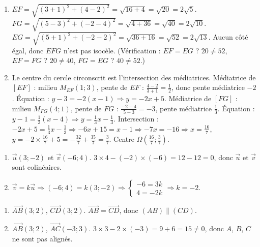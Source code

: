 \begin{enumerate}[label=\alph*)]
    \item $EF = \sqrt{(3+1)^2 + (4-2)^2} = \sqrt{16 + 4} = \sqrt{20} = 2\sqrt{5}$.
    $FG = \sqrt{(5-3)^2 + (-2-4)^2} = \sqrt{4 + 36} = \sqrt{40} = 2\sqrt{10}$.
    $EG = \sqrt{(5+1)^2 + (-2-2)^2} = \sqrt{36 + 16} = \sqrt{52} = 2\sqrt{13}$.
    Aucun côté égal, donc $EFG$ n'est pas isocèle. (Vérification : $EF = EG$ ? $20 \neq 52$, $EF = FG$ ? $20 \neq 40$, $FG = EG$ ? $40 \neq 52$.)
    \item Le centre du cercle circonscrit est l'intersection des médiatrices. Médiatrice de $[EF]$ : milieu $M_{EF}(1; 3)$, pente de $EF$ : $\frac{4-2}{3+1} = \frac{1}{2}$, donc pente médiatrice $-2$. Équation : $y - 3 = -2(x - 1) \Rightarrow y = -2x + 5$.
    Médiatrice de $[FG]$ : milieu $M_{FG}(4; 1)$, pente de $FG$ : $\frac{-2-4}{5-3} = -3$, pente médiatrice $\frac{1}{3}$. Équation : $y - 1 = \frac{1}{3}(x - 4) \Rightarrow y = \frac{1}{3}x - \frac{1}{3}$.
    Intersection : $-2x + 5 = \frac{1}{3}x - \frac{1}{3} \Rightarrow -6x + 15 = x - 1 \Rightarrow -7x = -16 \Rightarrow x = \frac{16}{7}$, $y = -2\times\frac{16}{7} + 5 = -\frac{32}{7} + \frac{35}{7} = \frac{3}{7}$. Centre $\Omega\left(\frac{16}{7}; \frac{3}{7}\right)$.
\end{enumerate}

\begin{enumerate}[label=\alph*)]
    \item $\vec{u}(3; -2)$ et $\vec{v}(-6; 4)$. $3 \times 4 - (-2) \times (-6) = 12 - 12 = 0$, donc $\vec{u}$ et $\vec{v}$ sont colinéaires.
    \item $\vec{v} = k\vec{u} \Rightarrow (-6; 4) = k(3; -2) \Rightarrow \begin{cases} -6 = 3k \\ 4 = -2k \end{cases} \Rightarrow k = -2$.
\end{enumerate}

\begin{enumerate}[label=\alph*)]
    \item $\overrightarrow{AB}(3; 2)$, $\overrightarrow{CD}(3; 2)$. $\overrightarrow{AB} = \overrightarrow{CD}$, donc $(AB) \parallel (CD)$.
    \item $\overrightarrow{AB}(3; 2)$, $\overrightarrow{AC}(-3; 3)$. $3 \times 3 - 2 \times (-3) = 9 + 6 = 15 \neq 0$, donc $A$, $B$, $C$ ne sont pas alignés.
\end{enumerate}

